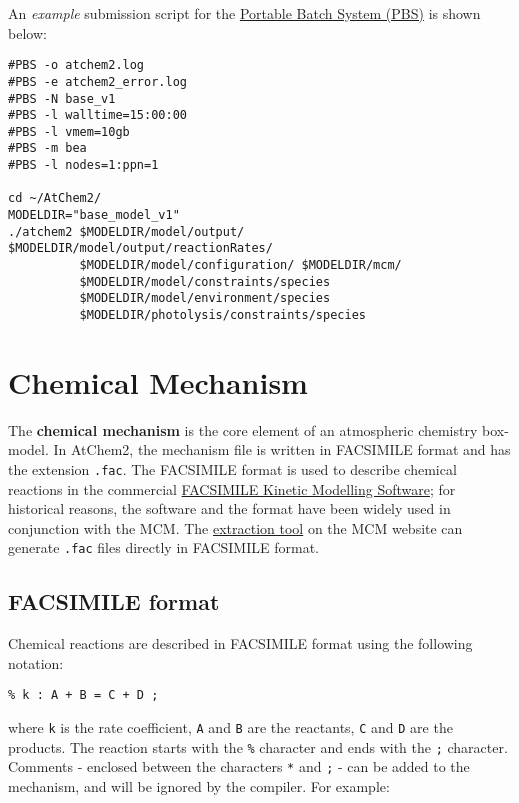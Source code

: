 An \emph{example} submission script for the
\href{https://en.wikipedia.org/wiki/Portable_Batch_System}{Portable
  Batch System (PBS)} is shown below:

\begin{verbatim}
#PBS -o atchem2.log
#PBS -e atchem2_error.log
#PBS -N base_v1
#PBS -l walltime=15:00:00
#PBS -l vmem=10gb
#PBS -m bea
#PBS -l nodes=1:ppn=1

cd ~/AtChem2/
MODELDIR="base_model_v1"
./atchem2 $MODELDIR/model/output/ $MODELDIR/model/output/reactionRates/
          $MODELDIR/model/configuration/ $MODELDIR/mcm/
          $MODELDIR/model/constraints/species
          $MODELDIR/model/environment/species
          $MODELDIR/photolysis/constraints/species
\end{verbatim}

\section{Chemical Mechanism} \label{sec:mechanism}

The \textbf{chemical mechanism} is the core element of an atmospheric
chemistry box-model. In AtChem2, the mechanism file is written in
FACSIMILE format and has the extension \texttt{.fac}. The FACSIMILE
format is used to describe chemical reactions in the commercial
\href{http://www.mcpa-software.com/}{FACSIMILE Kinetic Modelling
  Software}; for historical reasons, the software and the format have
been widely used in conjunction with the MCM. The
\href{http://mcm.leeds.ac.uk/MCMv3.3.1/extract.htt}{extraction tool}
on the MCM website can generate \texttt{.fac} files directly in
FACSIMILE format.

\subsection{FACSIMILE format} \label{subsec:facsimile-format}

Chemical reactions are described in FACSIMILE format using the
following notation:

\begin{verbatim}
% k : A + B = C + D ;
\end{verbatim}

where \texttt{k} is the rate coefficient, \texttt{A} and \texttt{B}
are the reactants, \texttt{C} and \texttt{D} are the products. The
reaction starts with the \texttt{\%} character and ends with the
\texttt{;} character. Comments - enclosed between the characters
\texttt{*} and \texttt{;} - can be added to the mechanism, and will be
ignored by the compiler. For example:

